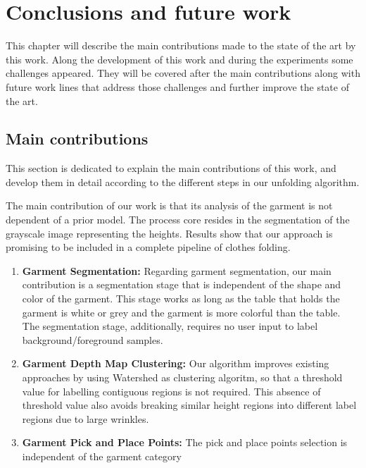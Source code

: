 \chapter{Conclusions and future work}
\label{conclusions_and_future_work}

This chapter will describe the main contributions made to the state of the art by this work. Along the development of this work and during the experiments some challenges appeared. They will be covered after the main contributions along with future work lines that address those challenges and  further improve the state of the art.


\section {Main contributions}
\label{conclusions:contributions}

This section is dedicated to explain the main contributions of this work, and develop them in detail according to the different steps in our unfolding algorithm.

The main contribution of our work is that its analysis of the garment is not dependent of a prior model. The process core resides in the segmentation of the grayscale image representing the heights. Results show that our approach is promising to be included in a complete pipeline of clothes folding.

\begin{enumerate}
	\item \textbf{Garment Segmentation:} Regarding garment segmentation, our main contribution is a segmentation stage that is independent of the shape and color of the garment. This stage works as long as the table that holds the garment is white or grey and the garment is more colorful than the table. The segmentation stage, additionally, requires no user input to label background/foreground samples.
	\item \textbf{Garment Depth Map Clustering:} Our algorithm improves existing approaches by using Watershed as clustering algoritm, so that a threshold value for labelling contiguous regions is not required. This absence of threshold value also avoids breaking similar height regions into different label regions due to large wrinkles. 
	\item \textbf{Garment Pick and Place Points:} The pick and place points selection is independent of the garment category \comment{[...]}
\end{enumerate}

